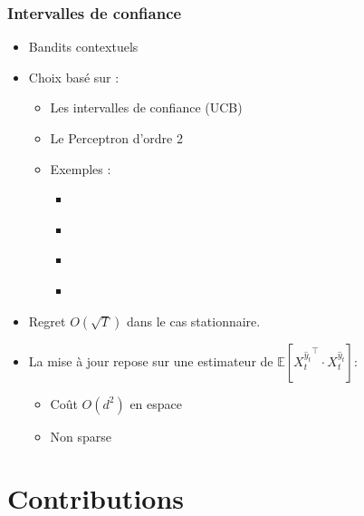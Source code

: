 \documentclass{beamer}
\begin{document}

\begin{frame}\frametitle{Intervalles de confiance}
	\begin{itemize}
		\item Bandits contextuels
		\item Choix basé sur :
		\begin{itemize}
			\item Les intervalles de confiance (UCB)\cite{lai1985asymptotically}
			\item Le Perceptron d'ordre 2 \cite{cesa2005second}
			\item Exemples :
			\begin{itemize}
				\item\cite{li2010contextual}
				\item\cite{hazan2011newtron}
				\item\cite{crammer2013multiclass}
				\item\cite{ngo2013upper}
			\end{itemize}
		\end{itemize} 
		\item Regret $O(\sqrt{T})$ dans le cas stationnaire.
		\item La mise à jour repose sur une estimateur de 
		$\mathbb{E}\left[ {X_t^{\hat{y}_t}}^\top \cdot X_t^{\hat{y}_t}\right]$:
		\begin{itemize}
			\item Coût $O(d^2)$ en espace
			\item Non sparse
		\end{itemize}
	\end{itemize}
	
\end{frame}

\section{Contributions}
\subsection{}
\end{document}
